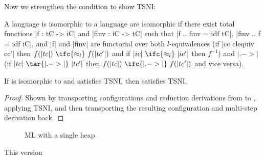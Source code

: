 Now we strengthen the condition to show TSNI:

\begin{definition}
    A language  is
    isomorphic to a language  are isomorphic if there exist total functions
    |f : tC -> iC| and |finv : iC -> tC| such that |f .. finv = idf tC|, |finv .. f = idf iC|, and |f| and |finv| are
    functorial over both $l$-equivalences (if |cc clequiv
    cc'| then $f(|tc|)\ \ifc{\approx_l}\ f(|tc'|)$ and if $|ic|\ \ifc{\approx_l}\ |ic'|$ then $f^{-1}$) and
    $|.->|$ (if $|tc|\ \tar{|.->|}\ |tc'|$ then $f(|tc|)\ \ifc{|.->|}\ f(|tc'|)$ and vice versa).
\end{definition}

\begin{theorem}
    If  is isomorphic to  and  satisfies TSNI, then
     satisfies TSNI.
\end{theorem}

\begin{proof}
    Shown by transporting configurations and reduction derivations from
     to , applying TSNI, and then transporting the
    resulting configuration and multi-step derivation back.
\end{proof}



\begin{figure}


\caption{ML with a single heap}
\label{fig:comb}
\end{figure}

This version
